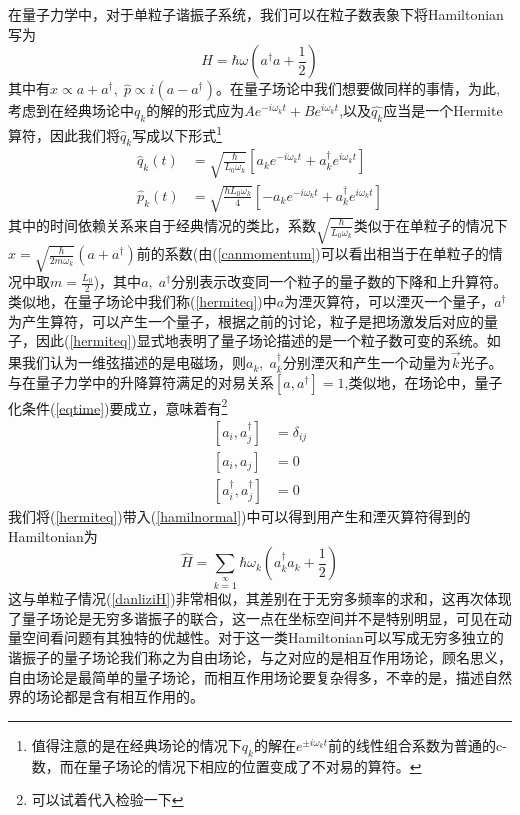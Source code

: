 在量子力学中，对于单粒子谐振子系统，我们可以在粒子数表象下将Hamiltonian写为
\begin{equation}
\label{danliziH}
    H=\hbar\omega(a^{\dagger}a+\frac{1}{2})
\end{equation}
其中有$\hat{x}\propto a+a^{\dagger},\;\hat{p}\propto i(a-a^{\dagger})$。在量子场论中我们想要做同样的事情，为此,考虑到在经典场论中$q_{k}$的解的形式应为$Ae^{-i\omega_{k}t}+Be^{i\omega_{k}t}$,以及$\hat{q_{k}}$应当是一个Hermite算符，因此我们将$\hat{q}_{k}$写成以下形式\footnote{值得注意的是在经典场论的情况下$q_{k}$的解在$e^{\pm i\omega_{k}t}$前的线性组合系数为普通的c-数，而在量子场论的情况下相应的位置变成了不对易的算符。}
\begin{equation}
\label{hermiteq}
\begin{aligned}
    \hat{q}_{k}(t)&=\sqrt{\frac{\hbar}{L_{0}\omega_{k}}}\left[a_{k}e^{-i\omega_{k}t}+a_{k}^{\dagger}e^{i\omega_{k}t}\right]\\
    \hat{p}_{k}(t)&=\sqrt{\frac{\hbar L_{0}\omega_{k}}{4}}\left[-a_{k}e^{-i\omega_{k}t}+a_{k}^{\dagger}e^{i\omega_{k}t}\right]
    \end{aligned}
\end{equation}
其中的时间依赖关系来自于经典情况的类比，系数$\sqrt{\frac{\hbar}{L_{0}\omega_{k}}}$类似于在单粒子的情况下$\hat{x}=\sqrt{\frac{\hbar}{2m\omega_{k}}}(a+a^{\dagger})$前的系数(由(\ref{canmomentum})可以看出相当于在单粒子的情况中取$m=\frac{L_{0}}{2}$)，其中$a,\;a^{\dagger}$分别表示改变同一个粒子的量子数的下降和上升算符。类似地，在量子场论中我们称(\ref{hermiteq})中$a$为湮灭算符，可以湮灭一个量子，$a^{\dagger}$为产生算符，可以产生一个量子，根据之前的讨论，粒子是把场激发后对应的量子，因此(\ref{hermiteq})显式地表明了量子场论描述的是一个粒子数可变的系统。如果我们认为一维弦描述的是电磁场，则$a_{k},\;a_{k}^{\dagger}$分别湮灭和产生一个动量为$\vec{k}$光子。与在量子力学中的升降算符满足的对易关系$\left[a,a^{\dagger}\right]=1$,类似地，在场论中，量子化条件(\ref{eqtime})要成立，意味着有\footnote{可以试着代入检验一下}
\begin{equation}
    \begin{aligned}
    \left[a_{i},a^{\dagger}_{j}\right]&=\delta_{ij}\\
    \left[a_{i},a_{j}\right]&=0\\
    \left[a^{\dagger}_{i},a^{\dagger}_{j}\right]&=0
    \end{aligned}
\end{equation}
我们将(\ref{hermiteq})带入(\ref{hamilnormal})中可以得到用产生和湮灭算符得到的Hamiltonian为
\begin{equation}
    \label{hamila}
    \hat{H}=\sum\limits_{k=1}\limits^{\infty}\hbar \omega_{k}\left(a_{k}^{\dagger}a_{k}+\frac{1}{2}\right)
\end{equation}
这与单粒子情况(\ref{danliziH})非常相似，其差别在于无穷多频率的求和，这再次体现了量子场论是无穷多谐振子的联合，这一点在坐标空间并不是特别明显，可见在动量空间看问题有其独特的优越性。对于这一类Hamiltonian可以写成无穷多独立的谐振子的量子场论我们称之为自由场论，与之对应的是相互作用场论，顾名思义，自由场论是最简单的量子场论，而相互作用场论要复杂得多，不幸的是，描述自然界的场论都是含有相互作用的。

